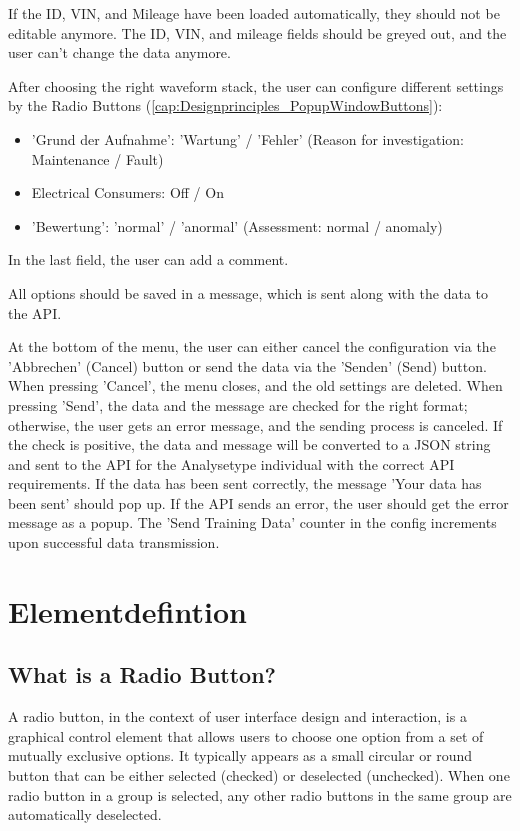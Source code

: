 \documentclass{scrreprt}
\begin{document}
If the ID, VIN, and Mileage have been loaded automatically, they should not be editable anymore. The ID, VIN, and mileage fields should be greyed out, and the user can't change the data anymore.

After choosing the right waveform stack, the user can configure different settings by the Radio Buttons (\ref{cap:Designprinciples_PopupWindowButtons}):
\begin{itemize}
    \item 'Grund der Aufnahme': 'Wartung' / 'Fehler' (Reason for investigation: Maintenance / Fault)
    \item Electrical Consumers: Off / On
    \item 'Bewertung': 'normal' / 'anormal' (Assessment: normal / anomaly)
\end{itemize}

In the last field, the user can add a comment.

All options should be saved in a message, which is sent along with the data to the API.

At the bottom of the menu, the user can either cancel the configuration via the 'Abbrechen' (Cancel) button or send the data via the 'Senden' (Send) button.
 When pressing 'Cancel', the menu closes, and the old settings are deleted. When pressing 'Send', the data and the message are checked for the right format; otherwise, the user gets an error message, 
 and the sending process is canceled. If the check is positive, the data and message will be converted to a JSON string and sent to the API for the Analysetype individual with the correct API requirements. 
 If the data has been sent correctly, the message 'Your data has been sent' should pop up.
 If the API sends an error, the user should get the error message as a popup. The 'Send Training Data' counter in the config increments upon successful data transmission.

 \section{Elementdefintion}

\subsection{What is a Radio Button?}\label{cap:RadioButton}

A radio button, in the context of user interface design and interaction, is a graphical control element that allows users to choose one option from a set of mutually exclusive options. 
It typically appears as a small circular or round button that can be either selected (checked) or deselected (unchecked). 
When one radio button in a group is selected, any other radio buttons in the same group are automatically deselected.
\end{document}
